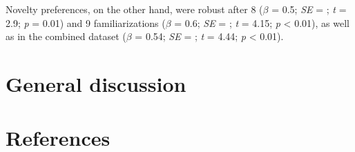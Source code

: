\documentclass[10pt, letterpaper]{article}
\begin{document}
Novelty preferences, on the other hand, were robust after 8 (\(\beta\) =
0.5; \emph{SE} = ; \emph{t} = 2.9; \emph{p} = 0.01) and 9
familiarizations (\(\beta\) = 0.6; \emph{SE} = ; \emph{t} = 4.15;
\emph{p} \textless{} 0.01), as well as in the combined dataset
(\(\beta\) = 0.54; \emph{SE} = ; \emph{t} = 4.44; \emph{p} \textless{}
0.01).

\hypertarget{general-discussion}{%
\section{General discussion}\label{general-discussion}}

\hypertarget{references}{%
\section{References}\label{references}}

\setlength{\parindent}{-0.1in} 
\setlength{\leftskip}{0.125in}

\noindent


\end{document}

